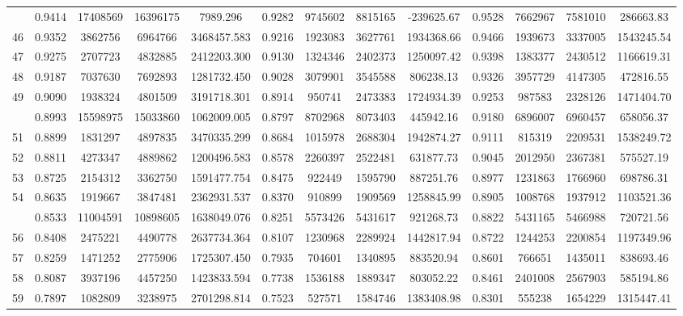 \documentclass[
  12pt,
]{article}
\begin{document}
\begin{longtable}[t]{lcccccccccccc}
\addlinespace
45 & 0.9414 & 17408569 & 16396175 & 7989.296 & 0.9282 & 9745602 & 8815165 & -239625.67 & 0.9528 & 7662967 & 7581010 & 286663.83\\
46 & 0.9352 & 3862756 & 6964766 & 3468457.583 & 0.9216 & 1923083 & 3627761 & 1934368.66 & 0.9466 & 1939673 & 3337005 & 1543245.54\\
47 & 0.9275 & 2707723 & 4832885 & 2412203.300 & 0.9130 & 1324346 & 2402373 & 1250097.42 & 0.9398 & 1383377 & 2430512 & 1166619.31\\
48 & 0.9187 & 7037630 & 7692893 & 1281732.450 & 0.9028 & 3079901 & 3545588 & 806238.13 & 0.9326 & 3957729 & 4147305 & 472816.55\\
49 & 0.9090 & 1938324 & 4801509 & 3191718.301 & 0.8914 & 950741 & 2473383 & 1724934.39 & 0.9253 & 987583 & 2328126 & 1471404.70\\
\addlinespace
50 & 0.8993 & 15598975 & 15033860 & 1062009.005 & 0.8797 & 8702968 & 8073403 & 445942.16 & 0.9180 & 6896007 & 6960457 & 658056.37\\
51 & 0.8899 & 1831297 & 4897835 & 3470335.299 & 0.8684 & 1015978 & 2688304 & 1942874.27 & 0.9111 & 815319 & 2209531 & 1538249.72\\
52 & 0.8811 & 4273347 & 4889862 & 1200496.583 & 0.8578 & 2260397 & 2522481 & 631877.73 & 0.9045 & 2012950 & 2367381 & 575527.19\\
53 & 0.8725 & 2154312 & 3362750 & 1591477.754 & 0.8475 & 922449 & 1595790 & 887251.76 & 0.8977 & 1231863 & 1766960 & 698786.31\\
54 & 0.8635 & 1919667 & 3847481 & 2362931.537 & 0.8370 & 910899 & 1909569 & 1258845.99 & 0.8905 & 1008768 & 1937912 & 1103521.36\\
\addlinespace
55 & 0.8533 & 11004591 & 10898605 & 1638049.076 & 0.8251 & 5573426 & 5431617 & 921268.73 & 0.8822 & 5431165 & 5466988 & 720721.56\\
56 & 0.8408 & 2475221 & 4490778 & 2637734.364 & 0.8107 & 1230968 & 2289924 & 1442817.94 & 0.8722 & 1244253 & 2200854 & 1197349.96\\
57 & 0.8259 & 1471252 & 2775906 & 1725307.450 & 0.7935 & 704601 & 1340895 & 883520.94 & 0.8601 & 766651 & 1435011 & 838693.46\\
58 & 0.8087 & 3937196 & 4457250 & 1423833.594 & 0.7738 & 1536188 & 1889347 & 803052.22 & 0.8461 & 2401008 & 2567903 & 585194.86\\
59 & 0.7897 & 1082809 & 3238975 & 2701298.814 & 0.7523 & 527571 & 1584746 & 1383408.98 & 0.8301 & 555238 & 1654229 & 1315447.41\\

\end{longtable}
\end{document}
